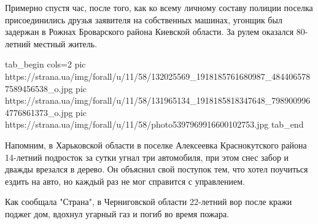 Примерно спустя час, после того, как ко всему личному составу полиции поселка
присоединились друзья заявителя на собственных машинах, угонщик был задержан в
Рожнах Броварского района Киевской области. За рулем оказался 80-летний местный
житель. 

\ifcmt
tab_begin cols=2
	pic https://strana.ua/img/forall/u/11/58/132025569_1918185761680987_4844065787589456538_o.jpg
	pic https://strana.ua/img/forall/u/11/58/131965134_1918185818347648_7989009964776861373_o.jpg
	pic https://strana.ua/img/forall/u/11/58/photo5397969916600102753.jpg
tab_end
\fi

Напомним, в Харьковской области в поселке Алексеевка Краснокутского района
14-летний подросток за сутки угнал три автомобиля, при этом снес забор и дважды
врезался в дерево. Он объяснил свой поступок тем, что хотел поучиться ездить на
авто, но каждый раз не мог справится с управлением.

Как сообщала "Страна", в Черниговской области 22-летний вор после кражи поджег
дом, вдохнул угарный газ и погиб во время пожара.
